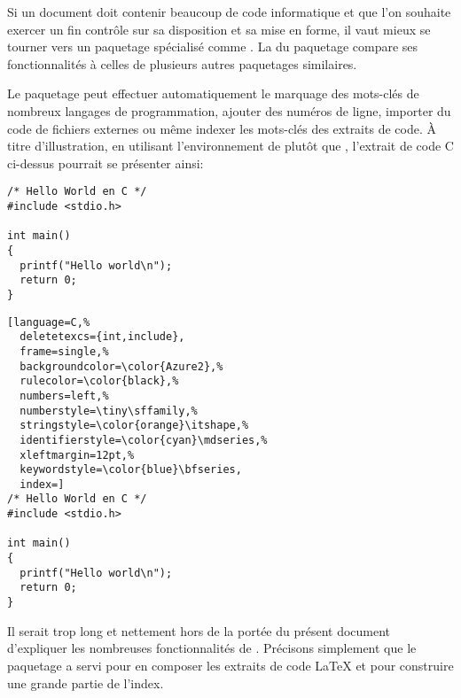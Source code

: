 Si un document doit contenir beaucoup de code informatique et que l'on
souhaite exercer un fin contrôle sur sa disposition et sa mise en
forme, il vaut mieux se tourner vers un paquetage spécialisé comme
 \citep{listings}. La %
du paquetage compare ses fonctionnalités à celles de plusieurs autres
paquetages similaires.

Le paquetage  peut effectuer automatiquement le marquage
des mots-clés de nombreux langages de programmation, ajouter des
numéros de ligne, importer du code de fichiers externes ou même
indexer les mots-clés des extraits de code. À titre d'illustration, en
utilisant l'environnement  de  plutôt que
, l'extrait de code C ci-dessus pourrait se présenter
ainsi:
\begin{demo}
  \begin{texample}
    \begin{vglisting}
\begin{lstlisting}
/* Hello World en C */
#include <stdio.h>

int main()
{
  printf("Hello world\n");
  return 0;
}
\end{lstlisting}
    \end{vglisting}
    \producing
\begin{lstlisting}[language=C,%
  deletetexcs={int,include},
  frame=single,%
  backgroundcolor=\color{Azure2},%
  rulecolor=\color{black},%
  numbers=left,%
  numberstyle=\tiny\sffamily,%
  stringstyle=\color{orange}\itshape,%
  identifierstyle=\color{cyan}\mdseries,%
  xleftmargin=12pt,%
  keywordstyle=\color{blue}\bfseries,
  index=]
/* Hello World en C */
#include <stdio.h>

int main()
{
  printf("Hello world\n");
  return 0;
}
\end{lstlisting}
  \end{texample}
\end{demo}

Il serait trop long et nettement hors de la portée du présent document
d'expliquer les nombreuses fonctionnalités de .
Précisons simplement que le paquetage a servi pour en composer les
extraits de code {\LaTeX} et pour construire une grande partie de
l'index.

